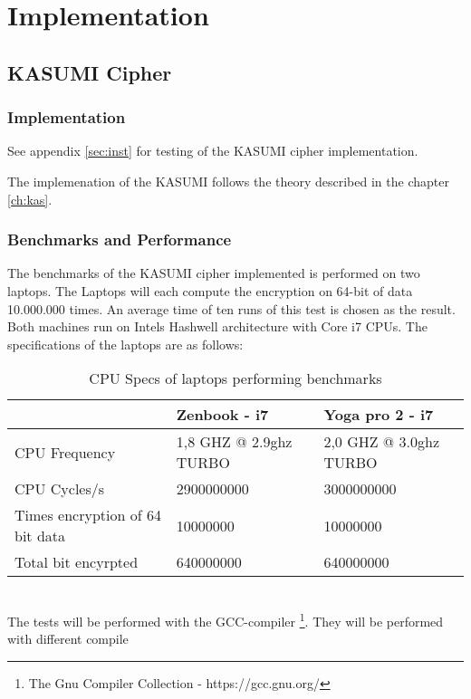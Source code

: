 \chapter{Implementation}
\label{ch:impl}
\section{KASUMI Cipher}
\subsection{Implementation}

See appendix \ref{sec:inst} for testing of the KASUMI cipher implementation.

The implemenation of the KASUMI follows the theory described in the
chapter \ref{ch:kas}.

\subsection{Benchmarks and Performance}
\label{sec:benchkas}
The benchmarks of the KASUMI cipher implemented is performed on two
laptops. The Laptops will each compute the encryption on 64-bit of
data 10.000.000 times. An average time of ten runs of this test is
chosen as the result. Both machines run on Intels Hashwell
architecture with Core i7 CPUs. The specifications of the laptops are as follows:
\begin{table}[h!]
    \begin{tabular}{l|l|l}
                                    & Zenbook - i7           & Yoga
                                                               pro 2 -
      i7\\ \hline
    CPU Frequency                   & 1,8 GHZ @ 2.9ghz TURBO & 2,0 GHZ @ 3.0ghz TURBO \\ \hline
    CPU Cycles/s                    & 2900000000             & 3000000000             \\ \hline
    Times encryption of 64 bit data & 10000000               & 10000000               \\ \hline
    Total bit encyrpted             & 640000000              & 640000000              \\
    \end{tabular}
    \caption{CPU Specs of laptops performing benchmarks}
    \label{tab:specs}
\end{table}\\
The tests will be performed with the
GCC-compiler \footnote{The Gnu Compiler Collection -
  https://gcc.gnu.org/}. They will be performed with different compile
